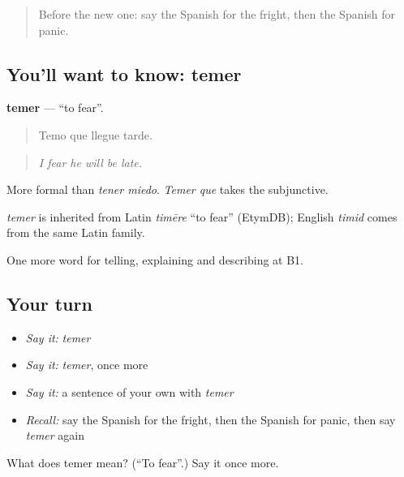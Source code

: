 \label{lesson:ES-C706-temer}



\begin{quote}
Before the new one: say the Spanish for the fright, then the Spanish for panic.
\end{quote}

\subsection*{You'll want to know: temer}
\textbf{temer} — \textquotedblleft{}to fear\textquotedblright{}.

\begin{quote}
Temo que llegue tarde.
\end{quote}

\begin{quote}
\emph{I fear he will be late.}
\end{quote}

More formal than \emph{tener miedo}. \emph{Temer que} takes the subjunctive.

\begin{cousinweb}
\emph{temer} is inherited from Latin \emph{timēre} \textquotedblleft{}to fear\textquotedblright{} (EtymDB); English \emph{timid} comes from the same Latin family.
\end{cousinweb}

\begin{grammarlens}[title={What you've built}]
One more word for telling, explaining and describing at B1.
\end{grammarlens}

\subsection*{Your turn}
\begin{itemize}
\raggedright
  \item \emph{Say it:} \emph{temer}
  \item \emph{Say it:} \emph{temer}, once more
  \item \emph{Say it:} a sentence of your own with \emph{temer}
  \item \emph{Recall:} say the Spanish for the fright, then the Spanish for panic, then say \emph{temer} again
\end{itemize}

\begin{tcolorbox}[breakable,colback=teal!4,colframe=teal!35!black,title={Before you move on}]
What does temer mean? (\textquotedblleft{}To fear\textquotedblright{}.) Say it once more.
\end{tcolorbox}
